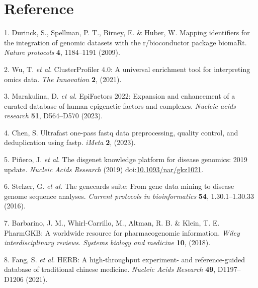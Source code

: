 \documentclass[
]{article}
\newenvironment{cslreferences}%
  {}%
  {\par}
\begin{document}
\hypertarget{bibliography}{%
\section*{Reference}\label{bibliography}}

\hypertarget{refs}{}
\begin{cslreferences}
\leavevmode\hypertarget{ref-MappingIdentifDurinc2009}{}%
1. Durinck, S., Spellman, P. T., Birney, E. \& Huber, W. Mapping identifiers for the integration of genomic datasets with the r/bioconductor package biomaRt. \emph{Nature protocols} \textbf{4}, 1184--1191 (2009).

\leavevmode\hypertarget{ref-ClusterprofilerWuTi2021}{}%
2. Wu, T. \emph{et al.} ClusterProfiler 4.0: A universal enrichment tool for interpreting omics data. \emph{The Innovation} \textbf{2}, (2021).

\leavevmode\hypertarget{ref-Epifactors2022Maraku2023}{}%
3. Marakulina, D. \emph{et al.} EpiFactors 2022: Expansion and enhancement of a curated database of human epigenetic factors and complexes. \emph{Nucleic acids research} \textbf{51}, D564--D570 (2023).

\leavevmode\hypertarget{ref-UltrafastOnePChen2023}{}%
4. Chen, S. Ultrafast one-pass fastq data preprocessing, quality control, and deduplication using fastp. \emph{iMeta} \textbf{2}, (2023).

\leavevmode\hypertarget{ref-TheDisgenetKnPinero2019}{}%
5. Piñero, J. \emph{et al.} The disgenet knowledge platform for disease genomics: 2019 update. \emph{Nucleic Acids Research} (2019) doi:\href{https://doi.org/10.1093/nar/gkz1021}{10.1093/nar/gkz1021}.

\leavevmode\hypertarget{ref-TheGenecardsSStelze2016}{}%
6. Stelzer, G. \emph{et al.} The genecards suite: From gene data mining to disease genome sequence analyses. \emph{Current protocols in bioinformatics} \textbf{54}, 1.30.1--1.30.33 (2016).

\leavevmode\hypertarget{ref-PharmgkbAWorBarbar2018}{}%
7. Barbarino, J. M., Whirl-Carrillo, M., Altman, R. B. \& Klein, T. E. PharmGKB: A worldwide resource for pharmacogenomic information. \emph{Wiley interdisciplinary reviews. Systems biology and medicine} \textbf{10}, (2018).

\leavevmode\hypertarget{ref-HerbAHighThFang2021}{}%
8. Fang, S. \emph{et al.} HERB: A high-throughput experiment- and reference-guided database of traditional chinese medicine. \emph{Nucleic Acids Research} \textbf{49}, D1197--D1206 (2021).


\end{cslreferences}
\end{document}
